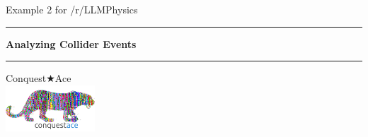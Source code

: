 \begin{titlepage}
    \begin{center}
        \vspace*{2cm}
        
        {\Large Example 2 for /r/LLMPhysics} \\[1.5cm]
        
        \hrule
        \vspace{1cm}
        
        {\Huge \textbf{Analyzing Collider Events}} \\[1cm]
        
        \hrule
        \vspace{1.5cm}
         \Large {Conquest{\(\bigstar\)}Ace}\\ [1 cm]
 

         {\includegraphics[width=0.25\textwidth]{logo.png} \\[1cm]}



        \vfill

    \end{center}
\end{titlepage}